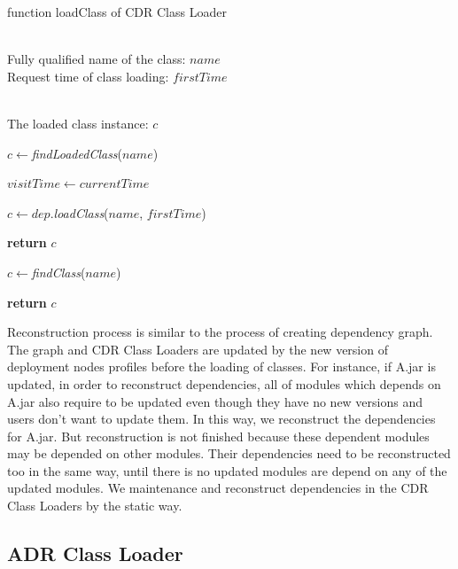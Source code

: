 \documentclass[conference]{IEEEtran}
\begin{document}
\begin{algorithm}[h]
\caption{function loadClass of CDR Class Loader}
\label{alg:CDR_Class_Loader}
\begin{algorithmic}[1]
\REQUIRE ~~\\
Fully qualified name of the class: $name$ \\
Request time of class loading: $firstTime$

\ENSURE ~~\\
The loaded class instance: $c$

\STATE $c\leftarrow$\emph{findLoadedClass}($name$)


	\STATE $visitTime\leftarrow currentTime$
	
		
		\STATE $c\leftarrow dep.$\emph{loadClass}($name$, $firstTime$)
		
			
			\STATE \textbf{return} $c$

		\ENDIF
	
	\ENDFOR

	\STATE $c\leftarrow$\emph{findClass}($name$)

\ELSE
	
	\STATE \textbf{return} $c$

\ENDIF


\end{algorithmic}
\end{algorithm}


Reconstruction process is similar to the process of creating dependency graph.
The graph and CDR Class Loaders are updated by the new version of deployment nodes profiles before the loading of classes.
For instance, if A.jar is updated, in order to reconstruct dependencies, all of modules which depends on A.jar also require to be updated even though they have no new versions and users don't want to update them.
In this way, we reconstruct the dependencies for A.jar.
But reconstruction is not finished because these dependent modules may be depended on other modules.
Their dependencies need to be reconstructed too in the same way, until there is no updated modules are depend on any of the updated modules. 
We maintenance and reconstruct dependencies in the CDR Class Loaders by the static way. 


\subsection{ADR Class Loader}
\end{document}
